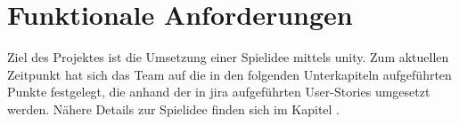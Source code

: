 \documentclass[../main.tex]{subfiles}
\begin{document}
    \section{Funktionale Anforderungen}
    Ziel des Projektes ist die Umsetzung einer Spielidee mittels \gls{unity}. Zum aktuellen Zeitpunkt hat sich das Team auf die in den folgenden Unterkapiteln aufgeführten Punkte festgelegt, die anhand der in \gls{jira} aufgeführten User-Stories umgesetzt werden. Nähere Details zur Spielidee finden sich im Kapitel .
\end{document}
